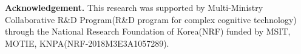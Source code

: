 \documentclass[10pt,twocolumn,letterpaper]{article}
\begin{document}
\noindent\footnotesize\textbf{Acknowledgement.} This research was supported by Multi-Ministry Collaborative R\&D Program(R\&D program for complex cognitive technology) through the National Research Foundation of Korea(NRF) funded by MSIT, MOTIE, KNPA(NRF-2018M3E3A1057289).


{\small


}
\end{document}
